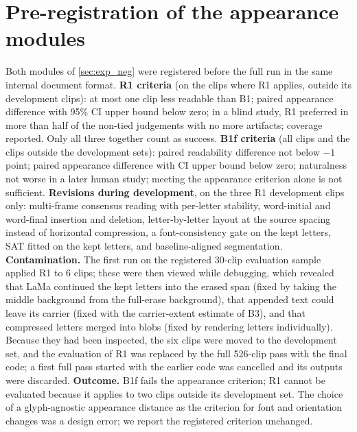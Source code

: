 \section{Pre-registration of the appearance modules}
\label{sec:supp_prereg_neg}
Both modules of \cref{sec:exp_neg} were registered before the full run in the same internal document format. \textbf{R1 criteria} (on the clips where R1 applies, outside its development clips): at most one clip less readable than B1; paired appearance difference with 95\% CI upper bound below zero; in a blind study, R1 preferred in more than half of the non-tied judgements with no more artifacts; coverage reported. Only all three together count as success. \textbf{B1f criteria} (all clips and the clips outside the development sets): paired readability difference not below $-1$ point; paired appearance difference with CI upper bound below zero; naturalness not worse in a later human study; meeting the appearance criterion alone is not sufficient. \textbf{Revisions during development}, on the three R1 development clips only: multi-frame consensus reading with per-letter stability, word-initial and word-final insertion and deletion, letter-by-letter layout at the source spacing instead of horizontal compression, a font-consistency gate on the kept letters, SAT fitted on the kept letters, and baseline-aligned segmentation. \textbf{Contamination.} The first run on the registered 30-clip evaluation sample applied R1 to 6 clips; these were then viewed while debugging, which revealed that LaMa continued the kept letters into the erased span (fixed by taking the middle background from the full-erase background), that appended text could leave its carrier (fixed with the carrier-extent estimate of B3), and that compressed letters merged into blobs (fixed by rendering letters individually). Because they had been inspected, the six clips were moved to the development set, and the evaluation of R1 was replaced by the full 526-clip pass with the final code; a first full pass started with the earlier code was cancelled and its outputs were discarded. \textbf{Outcome.} B1f fails the appearance criterion; R1 cannot be evaluated because it applies to two clips outside its development set. The choice of a glyph-agnostic appearance distance as the criterion for font and orientation changes was a design error; we report the registered criterion unchanged.

